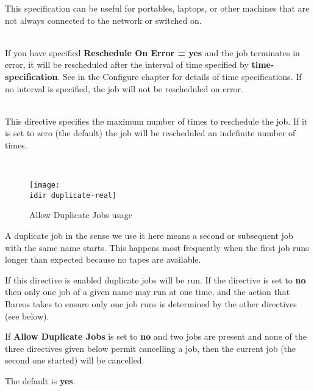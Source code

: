 \begin{description}
This specification can be useful for portables, laptops, or other
machines that are not always connected to the network or switched on.

\item [Reschedule Interval = {\textless}time-specification{\textgreater}] \hfill \\
If you have specified {\bf Reschedule On Error = yes} and the job
terminates in error, it will be rescheduled after the interval of time
specified by {\bf time-specification}.  See  in the Configure chapter for details of
time specifications.  If no interval is specified, the job will not be
rescheduled on error.

\item [Reschedule Times = {\textless}count{\textgreater}] \hfill \\
This directive specifies the maximum number of times to reschedule the
job.  If it is set to zero (the default) the job will be rescheduled an
indefinite number of times.

\item [Allow Duplicate Jobs = {\textless}yes{\textbar}no{\textgreater}] \hfill \\
\begin{figure}[htbp]
  \centering
  \texttt{[image: \\idir duplicate-real]}
  \caption{Allow Duplicate Jobs usage}
  \label{fig:allowduplicatejobs}
\end{figure}
A duplicate job in the sense we use it here means a second or subsequent job
with the same name starts.  This happens most frequently when the first job
runs longer than expected because no tapes are available.

If this directive is enabled duplicate jobs will be run.  If
the directive is set to {\bf no} then only one job of a given name
may run at one time, and the action that Bareos takes to ensure only
one job runs is determined by the other directives (see below).

If {\bf Allow Duplicate Jobs} is set to {\bf no} and two jobs
are present and none of the three directives given below permit
cancelling a job, then the current job (the second one started)
will be cancelled.

The default is {\bf yes}.



\end{description}
